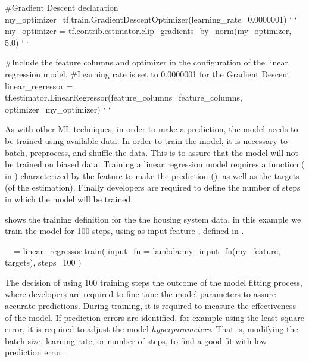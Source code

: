 \begin{tensorflow}[numbers=left,
	label={lst:lrm},
	caption={Generation of the linear regression model}]
 #Gradient Descent declaration
 my_optimizer=tf.train.GradientDescentOptimizer(learning_rate=0.0000001) ` \label{ln:gradient-init} `
 my_optimizer = tf.contrib.estimator.clip_gradients_by_norm(my_optimizer, 5.0) 
 ` \label{ln:gradient-end} `

 #Include the feature columns and optimizer in the configuration of the  linear regression model.
 #Learning rate is set to  0.0000001 for the Gradient Descent
 linear_regressor = tf.estimator.LinearRegressor(feature_columns=feature_columns, optimizer=my_optimizer) ` \label{ln:linear-model} `
\end{tensorflow}

As with other \ac{ML} techniques, in order to make a prediction, the model needs to be trained using 
available data. In order to train the model, it is necessary to batch, preprocess, and shuffle the data. 
This is to assure that the model will not be trained on biased data. 
Training a linear regression model requires a function ( in 
) characterized by the feature to make the prediction (), as 
well as the targets (of the estimation). Finally developers are required to define the number of steps 
in which the model will be trained.

 shows the training definition for the the housing system data. in this example we 
train the model for 100 steps, using as input feature , defined in 
. 

\begin{tensorflow}[
	label={lst:training},
	caption={Model training}]
 _ = linear_regressor.train(
    input_fn = lambda:my_input_fn(my_feature, targets),
    steps=100
 )
\end{tensorflow}

The decision of using 100 training steps the outcome of the model fitting process, where developers 
are required to fine tune the model parameters to assure accurate predictions. During training, it is 
required to measure the effectiveness of the model. If prediction errors are identified, for example 
using the least square error, it is required to adjust the model \emph{hyperparameters}. That is, 
modifying the batch size, learning rate, or number of steps, to find a good fit with low prediction error. 

